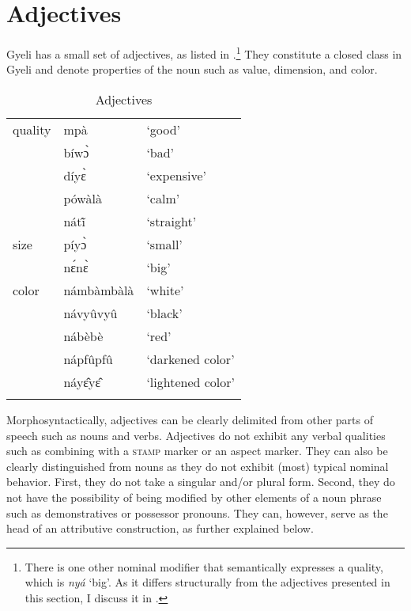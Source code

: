 \section{Adjectives}
\label{sec:QUAL}


Gyeli has a small set of adjectives, as listed in .\footnote{There is one other nominal modifier that semantically expresses a quality, which is {\itshape nyá} `big'. As it differs structurally from the adjectives presented in this section, I discuss it in .} They constitute a closed class in Gyeli and denote properties of the noun such as value, dimension, and color.

\begin{table}
\begin{tabular}{lll}
 \lsptoprule
 {quality} & mpà &  `good' \\
 & bíwɔ̀ &  `bad' \\
 & díyɛ̀  & `expensive' \\
 & pówàlà & `calm' \\
 & nátĩ̂ & `straight' \\
 \midrule
 {size}  & píyɔ̀ &  `small' \\
 & nɛ́nɛ̀ &  `big' \\
 \midrule
 {color} & námbàmbàlà & `white' \\
 & návyûvyû & `black' \\
 & nábèbè & `red' \\
 & nápfûpfû & `darkened color' \\
 & náyɛ̂yɛ̂ & `lightened color' \\
 \lspbottomrule
\end{tabular}
\caption{Adjectives}
\label{Tab:QUAL}
\end{table}

Morphosyntactically, adjectives can be clearly delimited from other parts of speech such as nouns and verbs. Adjectives do not exhibit any verbal qualities such as combining with a \textsc{stamp} marker or an aspect marker. They can also be clearly distinguished from nouns as they do not exhibit (most) typical nominal behavior. First, they do not take a singular and/or plural form. Second, they do not have the possibility of being modified by other elements of a noun phrase such as demonstratives or possessor pronouns. They can, however, serve as the head of an attributive construction, as further explained below.

